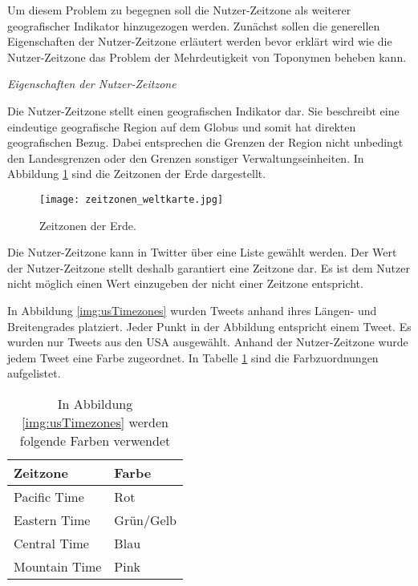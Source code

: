				Um diesem Problem zu begegnen soll die Nutzer-Zeitzone als weiterer geografischer Indikator hinzugezogen werden.
				Zunächst sollen die generellen Eigenschaften der Nutzer-Zeitzone erläutert werden bevor erklärt wird wie die Nutzer-Zeitzone das Problem der Mehrdeutigkeit von Toponymen beheben kann.

				\textit{Eigenschaften der Nutzer-Zeitzone}

					Die Nutzer-Zeitzone stellt einen geografischen Indikator dar.
					Sie beschreibt eine eindeutige geografische Region auf dem Globus und somit hat direkten geografischen Bezug.
					Dabei entsprechen die Grenzen der Region nicht unbedingt den Landesgrenzen oder den Grenzen sonstiger Verwaltungseinheiten. 
					In Abbildung \ref{img:timezones} sind die Zeitzonen der Erde dargestellt.

					\begin{figure}[!ht]
						\begin{center}
							\texttt{[image: zeitzonen\_weltkarte.jpg]}
							\caption{Zeitzonen der Erde.}
							\label{img:timezones}
						\end{center}
					\end{figure}	

					Die Nutzer-Zeitzone kann in Twitter über eine Liste gewählt werden.
					Der Wert der Nutzer-Zeitzone stellt deshalb garantiert eine Zeitzone dar.
					Es ist dem Nutzer nicht möglich einen Wert einzugeben der nicht einer Zeitzone entspricht.

					In Abbildung \ref{img:usTimezones} wurden Tweets anhand ihres Längen- und Breitengrades platziert.
					Jeder Punkt in der Abbildung entspricht einem Tweet.
					Es wurden nur Tweets aus den USA ausgewählt.
					Anhand der Nutzer-Zeitzone wurde jedem Tweet eine Farbe zugeordnet.
					In Tabelle \ref{tab:timezoneColors} sind die Farbzuordnungen aufgelistet. 

					\begin{table}[h]
					\centering
					\caption{In Abbildung \ref{img:usTimezones} werden folgende Farben verwendet}
					\label{tab:timezoneColors}
						\begin{tabular}{|l|l|}
							\hline
							Zeitzone      & Farbe     \\ \hline \hline
							Pacific Time  & Rot       \\ \hline
							Eastern Time  & Grün/Gelb \\ \hline
							Central Time  & Blau      \\ \hline
							Mountain Time & Pink      \\ \hline
						\end{tabular}
					\end{table}

